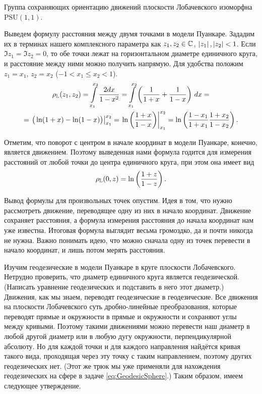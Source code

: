 \begin{proposition}
	Группа сохраняющих ориентацию движений плоскости Лобачевского изоморфна $\mathrm{PSU}(1, 1)$.
\end{proposition}

Выведем формулу расстояния между двумя точками в модели Пуанкаре. Зададим их в терминах нашего комплексного параметра как $z_1, z_2 \in \mathbb{C}$, $\left\lvert z_1\right\rvert, \left\lvert z_2\right\rvert < 1$. Если $\Im z_1 = \Im z_2 = 0$, то обе точки лежат на горизонтальном диаметре единичного круга, и расстояние между ними можно получить напрямую. Для удобства положим $z_1 = x_1$, $z_2 = x_2$ ($-1 < x_1 \leqslant x_2 < 1$).
\begin{multline*}
	\rho_{\mathbb{L}}(z_1, z_2) = \int\limits_{x_1}^{x_2}\frac{2dx}{1 - x^2} = \int\limits_{x_1}^{x_2}\left(\frac{1}{1 + x} + \frac{1}{1 - x}\right)\,dx =\\ = \left.\big(\ln(1 + x) - \ln(1 - x)\big)\right|_{x_1}^{x_2} = \left.\ln\left(\frac{1 + x}{1 - x}\right)\right|_{x_1}^{x_2} = \ln\left(\frac{1 - x_1}{1 + x_1}\frac{1 + x_2}{1 - x_2}\right).
\end{multline*}

Отметим, что поворот с центром в начале координат в модели Пуанкаре, конечно, является движением. Поэтому выведенная нами формула годится для измерения расстояний от любой точки до центра единичного круга, при этом она имеет вид
\begin{equation} \label{eq:rhoL0z}
	\rho_{\mathbb{L}}(0, z) = \ln\left(\frac{1 + z}{1 - z}\right).
\end{equation}

Вывод формулы для произвольных точек опустим. Идея в том, что нужно рассмотреть движение, переводящее одну из них в начало координат. Движение сохраняет расстояния, а формула измерения расстояния до начала координат нам уже известна. Итоговая формула выглядит весьма громоздко, да и почти никогда не нужна. Важно понимать идею, что можно сначала одну из точек перевести в начало координат, и лишь потом мерять расстояния.

Изучим геодезические в модели Пуанкаре в круге плоскости Лобачевского. Нетрудно проверить, что диаметр единичного круга является геодезической. (Написать уравнение геодезических и подставить в него этот диаметр.) Движения, как мы знаем, переводят геодезические в геодезические. Все движения на плоскости Лобачевского суть дробно-линейные преобразования, которые переводят прямые и окружности в прямые и окружности и сохраняют углы между кривыми. Поэтому такими движениями можно перевести наш диаметр в любой другой диаметр или в любую дугу окружности, перпендикулярной абсолюту. Но для каждой точки и для каждого направления найдётся кривая такого вида, проходящая через эту точку с таким направлением, поэтому других геодезических нет. (Этот же трюк мы уже применяли для нахождения геодезических на сфере в задаче \ref{eq:GeodesicSphere}.) Таким образом, имеем следующее утверждение.

